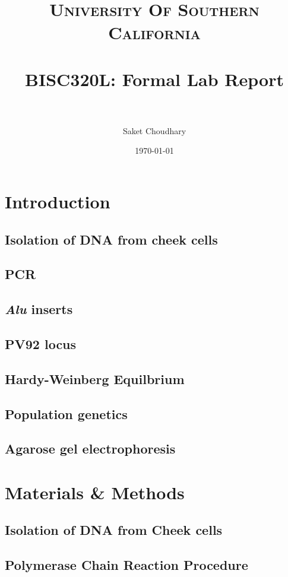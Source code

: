 \documentclass[paper=a4, fontsize=11pt]{scrartcl} %
\title{	
\normalfont \normalsize 
\textsc{University Of Southern California} \\ [25pt] %
\horrule{0.5pt} \\[0.4cm] %
\huge BISC320L: Formal Lab Report  \\ %
\horrule{2pt} \\[0.5cm] %
}
\author{Saket Choudhary} %
\date{\normalsize\today} %
\numberwithin{equation}{section} %
\numberwithin{figure}{section} %
\numberwithin{table}{section} %
\begin{document}
\maketitle %


\section{Introduction}
\subsection{Isolation of DNA from cheek cells}
\subsection{PCR}
\subsection{\textit{Alu} inserts}
\subsection{PV92 locus}
\subsection{Hardy-Weinberg Equilbrium}
\subsection{Population genetics}
\subsection{Agarose gel electrophoresis}


\section{Materials \& Methods}

\subsection{Isolation of DNA from Cheek cells}
\subsection{Polymerase Chain Reaction Procedure}
\end{document}
